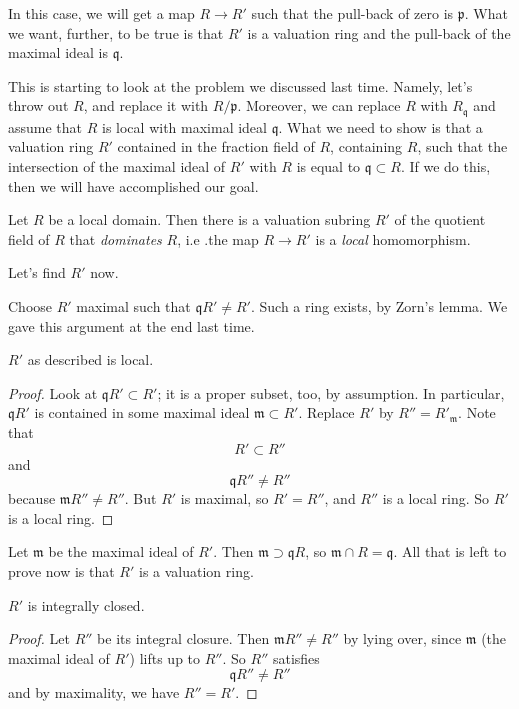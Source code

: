 In this case, we will get  a map $R \to R'$ such that the pull-back of zero is
$\mathfrak{p}$.  What we want, further, to be true is that $R'$ is a valuation
ring and the pull-back of the maximal ideal is $\mathfrak{q}$.



This is starting to look at the problem we discussed last time.
Namely, let's throw out $R$, and replace it with  $R/\mathfrak{p}$.
Moreover, we can replace $R$ with $R_{\mathfrak{q}}$ and assume that $R$ is
local with maximal ideal $\mathfrak{q}$.
What we need to show is that a valuation ring $R' $ contained in the fraction
field of $R$, containing $R$, such that the intersection of the maximal
ideal of
$R'$ with $R$ is equal to $\mathfrak{q} \subset R$.
If we do this, then we will have accomplished our goal.

\begin{lemma}
Let $R$ be a local domain. Then there is a valuation subring $R'$ of the
quotient
field of $R$ that \emph{dominates} $R$, i.e .the map $R \to R'$ is a
\emph{local} homomorphism.
\end{lemma}

Let's find $R'$ now.

Choose $R'$ maximal such that $\mathfrak{q} R' \neq R'$. Such a ring exists, by
Zorn's lemma. We gave this argument at the end last time.

\begin{lemma}
$R'$ as described is local.
\end{lemma}
\begin{proof}
Look at $\mathfrak{q}R' \subset R'$; it is a proper subset, too, by assumption.
In particular, $\mathfrak{q}R'$ is contained in some maximal ideal
$\mathfrak{m}\subset R'$.   Replace $R'$ by $R'' = R'_{\mathfrak{m}}$.
Note that
\[ R' \subset R''  \]
and
\[ \mathfrak{q}R'' \neq R''  \]
because $\mathfrak{m}R'' \neq R''$.  But $R'$ is maximal, so $R' = R''$, and
$R''$ is a local ring. So $R'$ is a local ring.
\end{proof}

Let $\mathfrak{m}$ be the maximal ideal of $R'$. Then $\mathfrak{m} \supset
\mathfrak{q}R$, so $\mathfrak{m} \cap R = \mathfrak{q}$.
All that is left to prove now is that $R'$ is a valuation ring.

\begin{lemma}
$R'$ is integrally closed.
\end{lemma}

\begin{proof}
Let $R''$ be its integral closure. Then $\mathfrak{m} R'' \neq R''$ by lying
over, since $\mathfrak{m}$ (the maximal ideal of $R'$) lifts up to $R''$. So
$R''$ satisfies
\[ \mathfrak{q}R'' \neq R''  \]
and by maximality, we have $R'' = R'$.
\end{proof}

